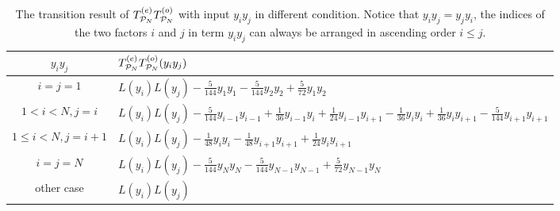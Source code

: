 \documentclass{article}
\begin{document}
\begin{table}
    \centering
    \renewcommand\arraystretch{2}
    \begin{tabular}{|c|l|}
        \hline$y_i y_j$ & $T^{(e)}_{\mathcal{P}_N}T^{(o)}_{\mathcal{P}_N} (y_i y_j)$ \\
        \hline$i=j=1$ & $L(y_i)L(y_j) -\frac{5}{144} y_1 y_1-\frac{5}{144} y_2 y_2+\frac{5}{72} y_1 y_2$ \\
        \hline $1<i<N, j=i$ & $L(y_i)L(y_j)-\frac{5}{144} y_{i-1} y_{i-1}+\frac{1}{36} y_{i-1} y_i+\frac{1}                           {24} y_{i-1} y_{i+1}-\frac{1}{36} y_i y_i+\frac{1}{36} y_i y_{i+1}-\frac{5}{144} y_{i+1} y_{i+1}$ \\
        \hline $1 \leq i<N, j=i+1$ & $L(y_i)L(y_j)-\frac{1}{48} y_i y_i-\frac{1}{48} y_{i+1} y_{i+1}+\frac{1}{24} y_i y_{i+1}$ \\
        \hline$i=j=N$ & $L(y_i)L(y_j)-\frac{5}{144} y_N y_N-\frac{5}{144} y_{N-1} y_{N-1}+\frac{5}{72} y_{N-1} y_N$ \\
        \hline other case & $L(y_i)L(y_j)$ \\
        \hline
    \end{tabular}
    \caption{The transition result of $T^{(e)}_{\mathcal{P}_N}T^{(o)}_{\mathcal{P}_N}$ with input $y_iy_j$ in different condition. Notice that $y_i y_j = y_j y_i$, the indices of the two factors $i$ and $j$ in term $y_iy_j$ can always be arranged in ascending order $i\leq j$.}
    \label{table: transition table of teto}
\end{table}
\end{document}
